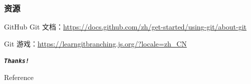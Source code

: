 \documentclass[UTF8, 16pt]{beamer}
\begin{document}
\begin{frame}
    \frametitle{资源}
    \textcolor{sufered}{GitHub Git 文档：}\url{https://docs.github.com/zh/get-started/using-git/about-git}
    
    \textcolor{sufered}{Git 游戏：}\url{https://learngitbranching.js.org/?locale=zh_CN}
\end{frame}






\begin{frame}[allowframebreaks]%
    \begin{center}
        \Huge\textbf{\textit{\texttt{Thanks!}}}
    \end{center}
\end{frame}

\appendix
\begin{frame}{Reference}
    \nocite{mit}
    \nocite{linuxcool}
    \addtocounter{framenumber}{-1}
    \printbibliography{} %
\end{frame}

\end{document}
